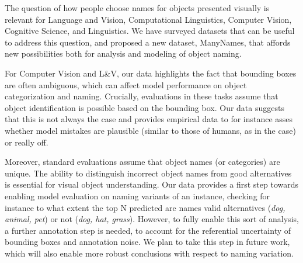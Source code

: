 
The question of how people choose names for objects presented visually is relevant for Language and Vision, Computational Linguistics, Computer Vision, Cognitive Science, and Linguistics.
We have surveyed datasets that can be useful to address this question, and proposed a new dataset, ManyNames, that affords new possibilities both for analysis and modeling of object naming.

For Computer Vision and L\&V, our data highlights the fact that bounding boxes are often ambiguous, which can affect model performance on object categorization and naming.
Crucially, evaluations in these tasks assume that object identification is possible based on the bounding box. 
Our data suggests that this is not always the case and provides empirical data to for instance asses whether model mistakes are plausible (similar to those of humans, as in the  case) or really off.

Moreover, standard evaluations assume that object names (or categories) are unique.
The ability to distinguish incorrect object names from good alternatives is essential for visual object understanding.
Our data provides a first step towards enabling model evaluation on naming variants of an instance, checking for instance to what extent the top N predicted are names valid alternatives (\textsl{dog, animal, pet}) or not (\textsl{dog, hat, grass}).
However, to fully enable this sort of analysis, a further annotation step is needed, to account for the referential uncertainty of bounding boxes and annotation noise.
We plan to take this step in future work, which will also enable more robust conclusions with respect to naming variation.

